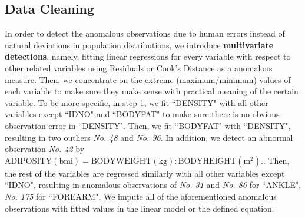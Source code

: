 \documentclass[11pt, letterpaper]{article}
\begin{document}
\subsection{Data Cleaning}
\label{subsec:Cleaning}

In order to detect the anomalous observations due to human errors instead of natural deviations in population distributions, we introduce \textbf{multivariate detections}, namely, fitting linear regressions for every variable with respect to other related variables using Residuals or Cook's Distance as a anomalous measure. Then, we concentrate on the extreme (maximum/minimum) values of each variable to make sure they make sense with practical meaning of the certain variable. To be more specific, in step 1, we fit ``DENSITY" with all other variables except ``IDNO" and ``BODYFAT" to make sure there is no obvious observation error in ``DENSITY". Then, we fit ``BODYFAT" with ``DENSITY", resulting in two outliers \emph{No. 48} and \emph{No. 96}. In addition, we detect an abnormal observation \emph{No. 42} by $\mathrm{ADIPOSITY(bmi)} = \mathrm{BODY WEIGHT(kg)} : \mathrm{BODY HEIGHT(m^2)}.$. Then, the rest of the variables are regressed similarly with all other variables except ``IDNO", resulting in anomalous observations of \emph{No. 31} and \emph{No. 86} for ``ANKLE", \emph{No. 175} for ``FOREARM". We impute all of the aforementioned anomalous observations with fitted values in the linear model or the defined equation. 
\end{document}
